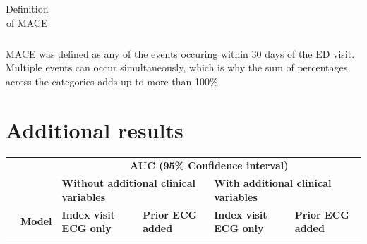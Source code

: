 \documentclass[preprint]{elsarticle}
\begin{document}
\begin{table}[H]
\begin{adjustbox}{center}
\begin{tabular}{@{}p{3.1cm}lrr@{}}
\bottomrule
\end{tabular}
\end{adjustbox}
\caption{Definition of MACE}
\medskip
\small
MACE was defined as any of the events occuring within 30 days of the ED visit. Multiple events can occur simultaneously, which is why the sum of percentages across the categories adds up to more than 100\%.
\label{table:appendix:mace}
\end{table}
\renewcommand{\arraystretch}{1}


\section{Additional results}
\label{sec:appendix:results}

\renewcommand{\arraystretch}{1.2}
\begin{table}[H]
  \centering
  \scriptsize
\begin{adjustbox}{center}
\begin{tabular}{@{}llcccc@{}}
  \toprule
  & & \multicolumn{4}{c}{\textbf{AUC (95\% Confidence interval)}} \\
  \cmidrule(lr){3-6}
  & & \multicolumn{2}{l}{\textbf{Without additional clinical variables}} & \multicolumn{2}{l}{\textbf{With additional clinical variables}} \\
  \cmidrule(lr){3-4}\cmidrule(lr){5-6}
  & \multicolumn{1}{l}{\textbf{Model}} & \multicolumn{1}{l}{\textbf{Index visit ECG only}} & \multicolumn{1}{l}{\textbf{Prior ECG added}} & \multicolumn{1}{l}{\textbf{Index visit ECG only}} & \multicolumn{1}{l}{\textbf{Prior ECG added}} \\
  \midrule


\end{tabular}
\end{adjustbox}
\end{table}
\end{document}
